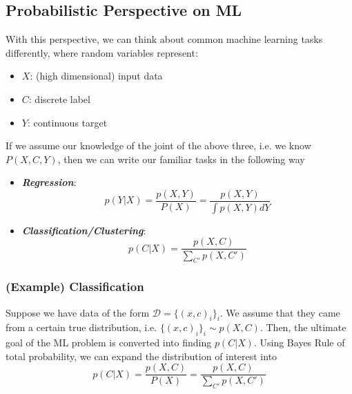 \documentclass[11pt]{article}
\begin{document}
\subsection{Probabilistic Perspective on ML}
With this perspective, we can think about common machine learning tasks differently, where random variables represent:
\begin{itemize}
    \item $X$: (high dimensional) input data
    \item $C$: discrete label
    \item $Y$: continuous target
\end{itemize}
If we assume our knowledge of the joint of the above three, i.e. we know $P(X,C,Y)$, then we can write our familiar tasks in the following way
\begin{itemize}
    \item \textit{\textbf{Regression}}:
        \begin{equation}
            p(Y|X) = \frac{p(X,Y)}{P(X)} = \frac{p(X,Y)}{\int p(X,Y)dY}
        \end{equation}
    \item \textit{\textbf{Classification/Clustering}}:
        \begin{equation}
            p(C|X) = \frac{p(X,C)}{\sum_{C'}p(X,C')}
        \end{equation}
\end{itemize}

\subsubsection{(Example) Classification} Suppose we have data of the form $\mathcal{D} = \{(x,c)_i\}_i$. We assume that they came from a certain true distribution, i.e. $\{(x,c)_i\}_i \sim p(X,C)$. Then, the ultimate goal of the ML problem is converted into finding $p(C|X)$. Using Bayes Rule of total probability, we can expand the distribution of interest into
\begin{equation}
    p(C | X)= \frac{p(X,C)}{P(X)} =\frac{p(X, C)}{\sum_{C'} p(X, C')}
\end{equation}
\end{document}
